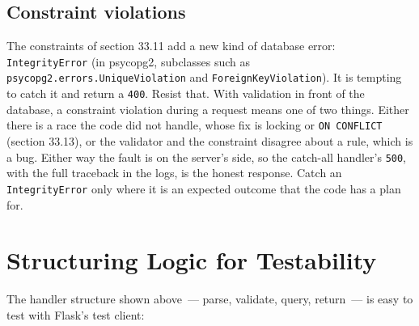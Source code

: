 \subsection*{Constraint violations}\label{33-logic-execution:constraint-violations}

The constraints of section 33.11 add a new kind of database error: \texttt{IntegrityError} (in psycopg2, subclasses such as \texttt{psycopg2.}\allowbreak{}\texttt{errors.}\allowbreak{}\texttt{UniqueViolation} and \texttt{ForeignKeyViolation}). It is tempting to catch it and return a \texttt{400}. Resist that. With validation in front of the database, a constraint violation during a request means one of two things. Either there is a race the code did not handle, whose fix is locking or \texttt{ON\ CONFLICT} (section 33.13), or the validator and the constraint disagree about a rule, which is a bug. Either way the fault is on the server's side, so the catch-all handler's \texttt{500}, with the full traceback in the logs, is the honest response. Catch an \texttt{IntegrityError} only where it is an expected outcome that the code has a plan for.

\setcounter{section}{15}
\section{Structuring Logic for Testability}\label{33-logic-execution:3316-structuring-logic-for-testability}

The handler structure shown above~--- parse, validate, query, return~--- is easy to test with Flask's test client:

